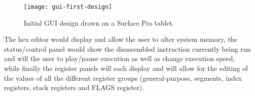     \begin{figure}
        \centering
        \texttt{[image: gui-first-design]}
        \caption{Initial GUI design drawn on a Surface Pro tablet.}
        \label{figure:gui-first-design}
    \end{figure}

    The hex editor would display and allow the user to alter system memory, the status/control panel would show the disassembled instruction currently being run and will the user to play/pause execution as well as change execution speed, while finally the register panels will each display and will allow for the editing of the values of all the different register groups (general-purpose, segments, index registers, stack registers and FLAGS register).